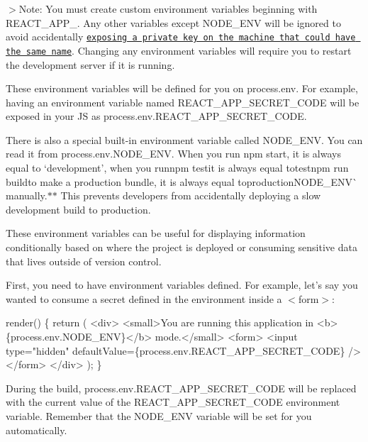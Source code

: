 $>$Note\+: You must create custom environment variables beginning with {\ttfamily R\+E\+A\+C\+T\+\_\+\+A\+P\+P\+\_\+}. Any other variables except {\ttfamily N\+O\+D\+E\+\_\+\+E\+NV} will be ignored to avoid accidentally \href{https://github.com/facebookincubator/create-react-app/issues/865#issuecomment-252199527}{\tt exposing a private key on the machine that could have the same name}. Changing any environment variables will require you to restart the development server if it is running.

These environment variables will be defined for you on {\ttfamily process.\+env}. For example, having an environment variable named {\ttfamily R\+E\+A\+C\+T\+\_\+\+A\+P\+P\+\_\+\+S\+E\+C\+R\+E\+T\+\_\+\+C\+O\+DE} will be exposed in your JS as {\ttfamily process.\+env.\+R\+E\+A\+C\+T\+\_\+\+A\+P\+P\+\_\+\+S\+E\+C\+R\+E\+T\+\_\+\+C\+O\+DE}.

There is also a special built-\/in environment variable called {\ttfamily N\+O\+D\+E\+\_\+\+E\+NV}. You can read it from {\ttfamily process.\+env.\+N\+O\+D\+E\+\_\+\+E\+NV}. When you run {\ttfamily npm start}, it is always equal to `\textquotesingle{}development'{\ttfamily , when you run}npm test{\ttfamily it is always equal to}\textquotesingle{}testnpm run build{\ttfamily to make a production bundle, it is always equal to}\textquotesingle{}productionN\+O\+D\+E\+\_\+\+E\+N\+V\`{} manually.$\ast$$\ast$ This prevents developers from accidentally deploying a slow development build to production.

These environment variables can be useful for displaying information conditionally based on where the project is deployed or consuming sensitive data that lives outside of version control.

First, you need to have environment variables defined. For example, let’s say you wanted to consume a secret defined in the environment inside a {\ttfamily $<$form$>$}\+:


\begin{DoxyCode}
render() \{
  return (
    <div>
      <small>You are running this application in <b>\{process.env.NODE\_ENV\}</b> mode.</small>
      <form>
        <input type="hidden" defaultValue=\{process.env.REACT\_APP\_SECRET\_CODE\} />
      </form>
    </div>
  );
\}
\end{DoxyCode}


During the build, {\ttfamily process.\+env.\+R\+E\+A\+C\+T\+\_\+\+A\+P\+P\+\_\+\+S\+E\+C\+R\+E\+T\+\_\+\+C\+O\+DE} will be replaced with the current value of the {\ttfamily R\+E\+A\+C\+T\+\_\+\+A\+P\+P\+\_\+\+S\+E\+C\+R\+E\+T\+\_\+\+C\+O\+DE} environment variable. Remember that the {\ttfamily N\+O\+D\+E\+\_\+\+E\+NV} variable will be set for you automatically.

